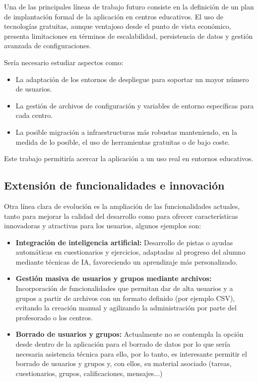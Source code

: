 Una de las principales líneas de trabajo futuro consiste en la definición de un plan de implantación formal de la aplicación en centros educativos. El uso de tecnologías gratuitas, aunque ventajoso desde el punto de vista económico, presenta limitaciones en términos de escalabilidad, persistencia de datos y gestión avanzada de configuraciones.

Sería necesario estudiar aspectos como:
\begin{itemize}
    \item La adaptación de los entornos de despliegue para soportar un mayor número de usuarios.
    \item La gestión de archivos de configuración y variables de entorno específicas para cada centro.
    \item La posible migración a infraestructuras más robustas manteniendo, en la medida de lo posible, el uso de herramientas gratuitas o de bajo coste.
\end{itemize}

Este trabajo permitiría acercar la aplicación a un uso real en entornos educativos.
\subsection{Extensión de funcionalidades e innovación}

Otra línea clara de evolución es la ampliación de las funcionalidades actuales, tanto para mejorar la calidad del desarrollo como para ofrecer características innovadoras y atractivas para los usuarios, algunos ejemplos son:

\begin{itemize}
    \item \textbf{Integración de inteligencia artificial:} Desarrollo de pistas o ayudas automáticas en cuestionarios y ejercicios, adaptadas al progreso del alumno mediante técnicas de IA, favoreciendo un aprendizaje más personalizado.
    \item \textbf{Gestión masiva de usuarios y grupos mediante archivos:} Incorporación de funcionalidades que permitan dar de alta usuarios y a grupos a partir de archivos con un formato definido (por ejemplo CSV), evitando la creación manual y agilizando la administración por parte del profesorado o los centros.
    \item \textbf{Borrado de usuarios y grupos:} Actualmente no se contempla la opción desde dentro de la aplicación para el borrado de datos por lo que sería necesaria asistencia técnica para ello, por lo tanto, es interesante permitir el borrado de usuarios y grupos y, con ellos, su material asociado (tareas, cuestionarios, grupos, calificaciones, mensajes...)
\end{itemize}


